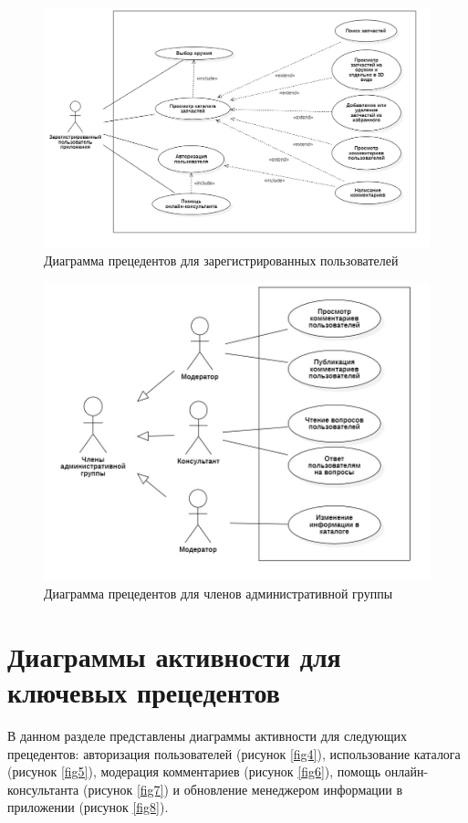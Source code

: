 \documentclass[14pt]{extreport}
\begin{document}
\begin{figure}[H]
\centerline{\includegraphics[width=1\linewidth]{reg}}
\caption{Диаграмма прецедентов для зарегистрированных пользователей}
\label{fig2}
\end{figure}

\begin{figure}[H]
\centerline{\includegraphics[width=0.7\linewidth]{adm}}
\caption{Диаграмма прецедентов для членов административной группы}
\label{fig3}
\end{figure}

\newpage
\section{Диаграммы активности для ключевых прецедентов}

В данном разделе представлены диаграммы активности для следующих прецедентов: авторизация пользователей (рисунок \ref{fig4}), использование каталога (рисунок \ref{fig5}), модерация комментариев (рисунок \ref{fig6}), помощь онлайн-консультанта (рисунок \ref{fig7}) и обновление менеджером информации в приложении (рисунок \ref{fig8}).
\end{document}
